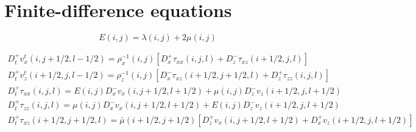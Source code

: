 \chapter{Finite-difference equations}

\begin{equation}
  E(i,j)=\lambda(i,j)+2\mu (i,j)
\end{equation}

\begin{eqnarray}
  D_{t}^{+}v_{x}^{t}({\scriptstyle i,j+1/2,l-1/2}) = \rho_{x}^{-1}({\scriptstyle i,j}) [D_{x}^{+}\tau_{xx}({\scriptstyle i,j,l})+D_{z}^{-}\tau_{xz}({\scriptstyle i+1/2,j,l})] \\
  D_{t}^{+}v_{z}^{t}({\scriptstyle i+1/2,j,l-1/2}) = \rho_{z}^{-1}({\scriptstyle i,j}) [D_{x}^{-}\tau_{xz}({\scriptstyle i+1/2,j+1/2,l})+D_{z}^{+}\tau_{zz}({\scriptstyle i,j,l})] \\
  D_{t}^{+}\tau_{xx}({\scriptstyle i,j,l}) = E({\scriptstyle i,j}) D_{x}^{-}v_{x}({\scriptstyle i,j+1/2,l+1/2})+\mu({\scriptstyle i,j}) D_{z}^{-}v_{z}({\scriptstyle i+1/2,j,l+1/2}) \\
  D_{t}^{+}\tau_{zz}({\scriptstyle i,j,l}) = \mu({\scriptstyle i,j}) D_{x}^{-}v_{x}({\scriptstyle i,j+1/2,l+1/2})+ E({\scriptstyle i,j}) D_{z}^{-}v_{z}({\scriptstyle i+1/2,j,l+1/2})\\
  D_{t}^{+}\tau_{xz}({\scriptstyle i+1/2,j+1/2,l}) = \bar{\mu}({\scriptstyle i+1/2,j+1/2})[D_{z}^{+}v_{x}({\scriptstyle i,j+1/2,l+1/2}) +D_{x}^{+}v_{z}({\scriptstyle i+1/2,j,l+1/2})]  
\end{eqnarray}
